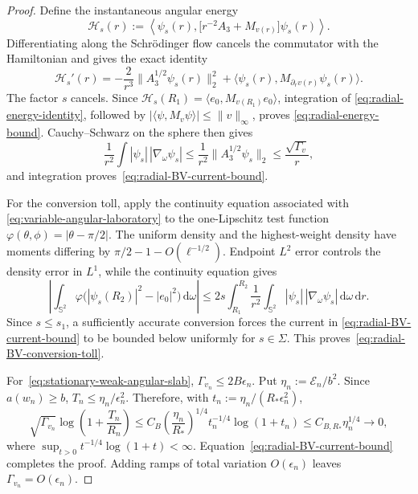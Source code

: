 \documentclass[11pt]{article}
\newcommand{\dd}{\,\mathrm d}
\theoremstyle{definition}
\theoremstyle{remark}
\begin{document}
\begin{proof}
Define the instantaneous angular energy
\begin{equation}
 \mathcal H_s(r)
 :=\left\langle\psi_s(r),
 \bigl[r^{-2}A_3+M_{v(r)}\bigr]\psi_s(r)\right\rangle.
\end{equation}
Differentiating along the Schr\"odinger flow cancels the commutator with the
Hamiltonian and gives the exact identity
\begin{equation}
 \mathcal H_s'(r)
 =-\frac2{r^3}\|A_3^{1/2}\psi_s(r)\|_2^2
 +\langle\psi_s(r),M_{\partial_rv(r)}\psi_s(r)\rangle.
 \label{eq:radial-energy-identity}
\end{equation}
The factor $s$ cancels.  Since
$\mathcal H_s(R_1)=\langle e_0,M_{v(R_1)}e_0\rangle$, integration of
\eqref{eq:radial-energy-identity}, followed by
$|\langle\psi,M_v\psi\rangle|\leq\|v\|_\infty$, proves
\eqref{eq:radial-energy-bound}.  Cauchy--Schwarz on the sphere then gives
\begin{equation}
 \frac1{r^2}\int|\psi_s|\,|\nabla_\omega\psi_s|
 \leq \frac1{r^2}\|A_3^{1/2}\psi_s\|_2
 \leq\frac{\sqrt{\Gamma_v}}r,
\end{equation}
and integration proves~\eqref{eq:radial-BV-current-bound}.

For the conversion toll, apply the continuity equation associated with
\eqref{eq:variable-angular-laboratory} to the one-Lipschitz test function
$\varphi(\theta,\phi)=|\theta-\pi/2|$.  The uniform density and the
highest-weight density have moments differing by
$\pi/2-1-O(\ell^{-1/2})$.  Endpoint $L^2$ error controls the density error in
$L^1$, while the continuity equation gives
\begin{equation}
 \left|\int_{\mathbb S^2}\varphi
 \bigl(|\psi_s(R_2)|^2-|e_0|^2\bigr)\dd\omega\right|
 \leq 2s\int_{R_1}^{R_2}\frac1{r^2}
 \int_{\mathbb S^2}|\psi_s|\,|\nabla_\omega\psi_s|
 \dd\omega\dd r.
\end{equation}
Since $s\leq s_1$, a sufficiently accurate conversion forces the current in
\eqref{eq:radial-BV-current-bound} to be bounded below uniformly for
$s\in\Sigma$.  This proves~\eqref{eq:radial-BV-conversion-toll}.

For~\eqref{eq:stationary-weak-angular-slab},
$\Gamma_{v_n}\leq2B\epsilon_n$.  Put
$\eta_n:=\mathcal E_n/b^2$.  Since $a(w_n)\geq b$,
$T_n\leq\eta_n/\epsilon_n^2$.  Therefore, with
$t_n:=\eta_n/(R_*\epsilon_n^2)$,
\begin{equation}
 \sqrt{\Gamma_{v_n}}
 \log\left(1+\frac{T_n}{R_n}\right)
 \leq C_B\left(\frac{\eta_n}{R_*}\right)^{1/4}
 t_n^{-1/4}\log(1+t_n)
 \leq C_{B,R_*}\eta_n^{1/4}\longrightarrow0,
\end{equation}
where $\sup_{t>0}t^{-1/4}\log(1+t)<\infty$.
Equation~\eqref{eq:radial-BV-current-bound} completes the proof.  Adding ramps
of total variation $O(\epsilon_n)$ leaves $\Gamma_{v_n}=O(\epsilon_n)$.
\end{proof}
\end{document}
